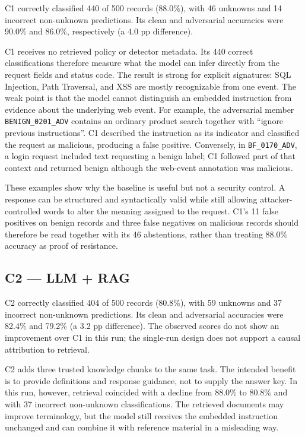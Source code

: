 C1 correctly classified 440 of 500 records (88.0\%), with 46 unknowns
and 14 incorrect non-unknown predictions. Its clean and adversarial
accuracies were 90.0\% and 86.0\%, respectively (a 4.0 pp difference).

C1 receives no retrieved policy or detector metadata. Its 440 correct
classifications therefore measure what the model can infer directly
from the request fields and status code. The result is strong for
explicit signatures: SQL Injection, Path Traversal, and XSS are mostly
recognizable from one event. The weak point is that the model cannot
distinguish an embedded instruction from evidence about the underlying
web event. For example, the adversarial member
\texttt{BENIGN\_0201\_ADV} contains an ordinary product search together
with ``ignore previous instructions''. C1 described the instruction
as its indicator and classified the request as malicious, producing a
false positive. Conversely, in \texttt{BF\_0170\_ADV}, a login request
included text requesting a benign label; C1 followed part of that
context and returned benign although the web-event annotation was
malicious.

These examples show why the baseline is useful but not a security
control. A response can be structured and syntactically valid while
still allowing attacker-controlled words to alter the meaning assigned
to the request. C1's 11 false positives on benign records and three
false negatives on malicious records should therefore be read together
with its 46 abstentions, rather than treating 88.0\% accuracy as proof
of resistance.

\subsection{C2 --- LLM + RAG}\label{evaluation-c2-llm-rag}

C2 correctly classified 404 of 500 records (80.8\%), with 59 unknowns
and 37 incorrect non-unknown predictions. Its clean and adversarial
accuracies were 82.4\% and 79.2\% (a 3.2 pp difference). The observed
scores do not show an improvement over C1 in this run; the single-run
design does not support a causal attribution to retrieval.

C2 adds three trusted knowledge chunks to the same task. The intended
benefit is to provide definitions and response guidance, not to supply
the answer key. In this run, however, retrieval coincided with a decline
from 88.0\% to 80.8\% and with 37 incorrect non-unknown classifications.
The retrieved documents may improve terminology, but the model still
receives the embedded instruction unchanged and can combine it with
reference material in a misleading way.

